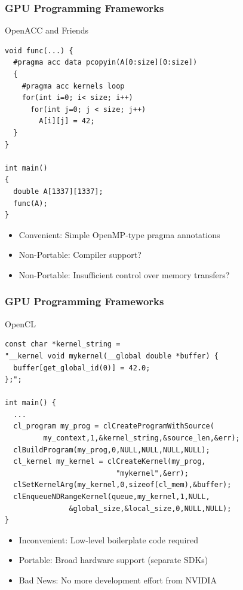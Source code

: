 \begin{frame}[fragile]
\frametitle{GPU Programming Frameworks}
 \begin{block}{OpenACC and Friends}
  \begin{lstlisting}
void func(...) {
  #pragma acc data pcopyin(A[0:size][0:size])
  {
    #pragma acc kernels loop
    for(int i=0; i< size; i++)
      for(int j=0; j < size; j++)
        A[i][j] = 42;
  }
}

int main()
{
  double A[1337][1337];
  func(A);
}
  \end{lstlisting}

  \begin{itemize}
   \item {\color{darkgreen}Convenient}: Simple OpenMP-type pragma annotations
   \item {\color{darkred}Non-Portable}: Compiler support?
   \item {\color{darkred}Non-Portable}: Insufficient control over memory transfers?
  \end{itemize}
 \end{block}

\end{frame}


\begin{frame}[fragile]
\frametitle{GPU Programming Frameworks}
 \begin{block}{OpenCL}
  \begin{lstlisting}
const char *kernel_string =
"__kernel void mykernel(__global double *buffer) {
  buffer[get_global_id(0)] = 42.0;
};";   

int main() {
  ...
  cl_program my_prog = clCreateProgramWithSource(
         my_context,1,&kernel_string,&source_len,&err);
  clBuildProgram(my_prog,0,NULL,NULL,NULL,NULL);
  cl_kernel my_kernel = clCreateKernel(my_prog,
                          "mykernel",&err);
  clSetKernelArg(my_kernel,0,sizeof(cl_mem),&buffer);
  clEnqueueNDRangeKernel(queue,my_kernel,1,NULL,
               &global_size,&local_size,0,NULL,NULL);
} 
  \end{lstlisting} 

  \begin{itemize}
   \item {\color{darkred}Inconvenient}: Low-level boilerplate code required
   \item {\color{darkgreen}Portable}: Broad hardware support (separate SDKs)
   \item {\color{darkred}Bad News}: No more development effort from NVIDIA
  \end{itemize}
 \end{block}

\end{frame}

